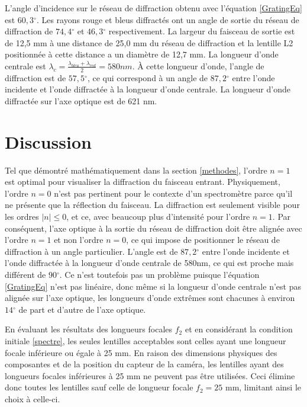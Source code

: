\documentclass[conference]{IEEEtran}
\begin{document}
L'angle d'incidence sur le réseau de diffraction obtenu avec l'équation \ref{GratingEq}
est $60,3{^\circ}$. Les rayons rouge et bleus diffractés ont un angle de sortie du réseau
de diffraction de $74,4{^\circ}$ et $46,3{^\circ}$ respectivement. La largeur du faisceau
de sortie est de 12,5 mm à une distance de 25,0 mm du réseau de diffraction et la lentille L2
positionnée à cette distance a un diamètre de 12,7 mm. La longueur d'onde centrale est 
$\lambda_c=\frac{\lambda_{bleu}+\lambda_{red}}{2}=580nm$. À cette longueur d'onde, l'angle de 
diffraction est de $57,5{^\circ}$, ce qui correspond à un angle de $87,2{^\circ}$ entre 
l'onde incidente et l'onde diffractée à la longueur d'onde centrale. 
La longueur d'onde diffractée sur l'axe optique est de 621 nm.

\section{Discussion}
Tel que démontré mathématiquement dans la section \ref{methodes}, l'ordre $n=1$ est optimal pour visualiser la diffraction
du faisceau entrant. Physiquement, l'ordre $n=0$ n'est pas pertinent pour le contexte d'un spectromètre parce qu'il ne présente que 
la réflection du faisceau. La diffraction est seulement visible pour les ordres $|n|\leq0$, et ce, avec beaucoup plus d'intensité pour l'ordre $n=1$.
Par conséquent, l'axe optique à la sortie du réseau de diffraction doit être alignée avec l'ordre $n=1$ et non l'ordre $n=0$, ce qui impose
de positionner le réseau de diffraction à un angle particulier. L'angle est de $87,2{^\circ}$ entre 
l'onde incidente et l'onde diffractée à la longueur d'onde centrale de 580nm, ce qui est proche mais 
différent de $90{^\circ}$. Ce n'est toutefois pas un problème puisque l'équation \ref{GratingEq} 
n'est pas linéaire, donc même si la longueur d'onde centrale n'est pas alignée sur l'axe optique, les
longueurs d'onde extrêmes sont chacunes à environ $14{^\circ}$ de part et d'autre de l'axe optique.

En évaluant les résultats des longueurs focales $f_2$ et en considérant la condition initiale \ref{spectre}, les seules lentilles acceptables sont celles
ayant une longueur focale inférieure ou égale à 25 mm. En raison des dimensions physiques des composantes et de
la position du capteur de la caméra, les lentilles ayant des longueurs focales inférieures à 25 mm ne peuvent pas être utilisées.
Ceci élimine donc toutes les lentilles sauf celle de longueur focale $f_2=25$ mm, limitant ainsi le choix à celle-ci.
\end{document}

